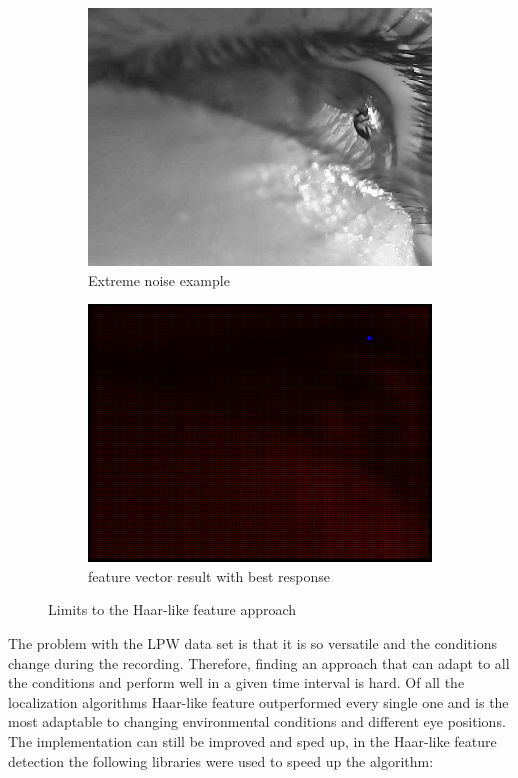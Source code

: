 \begin{figure}[h]
    \centering
    \begin{subfigure}{0.5\textwidth}
        \centering
        \includegraphics[width=0.9\linewidth]{plots/results/originalworst.png}
        \caption{Extreme noise example}
    \end{subfigure}%
    \hfill
    \begin{subfigure}{0.5\textwidth}
        \centering
        \includegraphics[width=0.9\linewidth]{plots/results/responsehaarworst.png}
        \caption{feature vector result with best response}
    \end{subfigure}%
 
    \caption{Limits to the Haar-like feature approach}
    \label{fig:limit_haar}
\end{figure}
The problem with the LPW data set is that it is so versatile and the conditions change during the recording. Therefore, finding an approach that can adapt to all the conditions and perform well in a given time interval is hard. Of all the localization algorithms Haar-like feature outperformed every single one and is the most adaptable to changing environmental conditions and different eye positions. The implementation can still be improved and sped up, in the Haar-like feature detection the following libraries were used to speed up the algorithm: 

